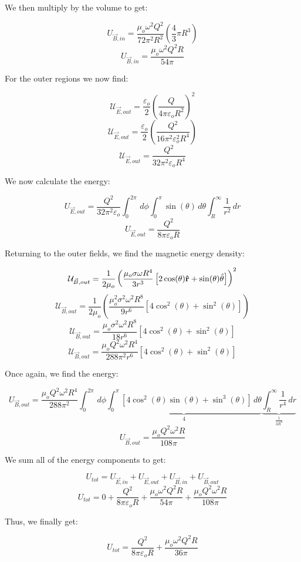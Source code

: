 \begin{enumerate}
\begin{enumerate}
        We then multiply by the volume to get:

        $$U_{\vec{B},in}=\frac{\mu_o\omega^2Q^2}{72\pi^2R^2}\left( \frac{4}{3}\pi R^3 \right)$$
        $$U_{\vec{B},in}=\frac{\mu_o\omega^2Q^2R}{54\pi}$$

        For the outer regions we now find:

        $$\mathcal{U}_{\vec{E},out}=\frac{\varepsilon_o}{2}\left( \frac{Q}{4\pi\varepsilon_o R^2} \right)^2$$
        $$\mathcal{U}_{\vec{E},out}=\frac{\varepsilon_o}{2}\left( \frac{Q^2}{16\pi^2\varepsilon_o^2 R^4} \right)$$
        $$\mathcal{U}_{\vec{E},out}=\frac{Q^2}{32\pi^2\varepsilon_o R^4}$$

        We now calculate the energy:

        $$U_{\vec{E},out}=\frac{Q^2}{32\pi^2\varepsilon_o}\int_0^{2\pi}\,d\phi\int_0^\pi\sin(\theta)\,d\theta\int_{R}^\infty \frac{1}{r^2}\,dr$$
        $$U_{\vec{E},out}=\frac{Q^2}{8\pi\varepsilon_oR}$$

        Returning to the outer fields, we find the magnetic energy density:

        $$\mathcal{U}_{\vec{B},out}=\frac{1}{2\mu_o}\left(\frac{\mu_o\sigma\omega R^4}{3r^3}\left[ 2\cos(\theta)\bold{\hat{r}}+\sin(\theta)\hat{\theta} \right]  \right)^2$$
        $$\mathcal{U}_{\vec{B},out}=\frac{1}{2\mu_o}\left(\frac{\mu_o^2\sigma^2\omega^2 R^8}{9r^6}\left[ 4\cos^2(\theta)+\sin^2(\theta)\right]  \right)$$
        $$\mathcal{U}_{\vec{B},out}=\frac{\mu_o\sigma^2\omega^2 R^8}{18r^6}\left[ 4\cos^2(\theta)+\sin^2(\theta)\right] $$
        $$\mathcal{U}_{\vec{B},out}=\frac{\mu_oQ^2\omega^2 R^4}{288\pi^2r^6}\left[ 4\cos^2(\theta)+\sin^2(\theta)\right] $$

        Once again, we find the energy:

        $$U_{\vec{B},out}=\frac{\mu_oQ^2\omega^2 R^4}{288\pi^2}\int_0^{2\pi}\,d\phi\underbrace{\int_0^\pi\left[ 4\cos^2(\theta)\sin(\theta)+\sin^3(\theta)\right]\,d\theta}_{4}\underbrace{\int_R^\infty \frac{1}{r^4}\,dr}_{\frac{1}{3R^3}}$$
        $$U_{\vec{B},out}=\frac{\mu_oQ^2\omega^2 R}{108\pi}$$

        We sum all of the energy components to get:

        $$U_{tot}=U_{\vec{E},in}+U_{\vec{E},out}+U_{\vec{B},in}+U_{\vec{B},out}$$
        $$U_{tot}=0+\frac{Q^2}{8\pi\varepsilon_o R}+\frac{\mu_o\omega^2Q^2R}{54\pi}+\frac{\mu_oQ^2\omega^2 R}{108\pi}$$

        Thus, we finally get:

        $$\boxed{U_{tot}=\frac{Q^2}{8\pi\varepsilon_o R}+\frac{\mu_o\omega^2Q^2R}{36\pi}}$$


\end{enumerate}
\end{enumerate}
